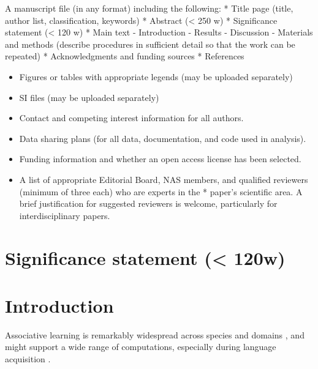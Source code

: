 \documentclass[]{article}
\providecommand{\tightlist}{%
  \setlength{\itemsep}{0pt}\setlength{\parskip}{0pt}}
\begin{document}
A manuscript file (in any format) including the following: * Title page (title, author list, classification, keywords) * Abstract (\textless{} 250 w) * Significance statement (\textless{} 120 w) * Main text - Introduction - Results - Discussion - Materials and methods (describe procedures in sufficient detail so that the work can be repeated) * Acknowledgments and funding sources * References

\begin{itemize}
\tightlist
\item
  Figures or tables with appropriate legends (may be uploaded
  separately)
\item
  SI files (may be uploaded separately)
\item
  Contact and competing interest information for all authors.
\item
  Data sharing plans (for all data, documentation, and code used in
  analysis).
\item
  Funding information and whether an open access license has been
  selected.
\item
A list of appropriate Editorial Board, NAS members, and qualified reviewers (minimum of three each) who are experts in the * paper's scientific area. A brief justification for suggested reviewers is welcome, particularly for interdisciplinary papers.
\end{itemize}

\section{Significance statement (\textless{}
120w)}\label{significance-statement-120w}

\section{Introduction}\label{introduction}



Associative learning is remarkably widespread across species and domains \citep{Aslin1998,Chen2015,Fiser2002,Hauser2001,Saffran-Science,Toro2005-backward,Turk-Browne-reversal}, and might support a wide range of computations, especially during language acquisition \citep{Aslin2012, Seidenberg2002}.
\end{document}

